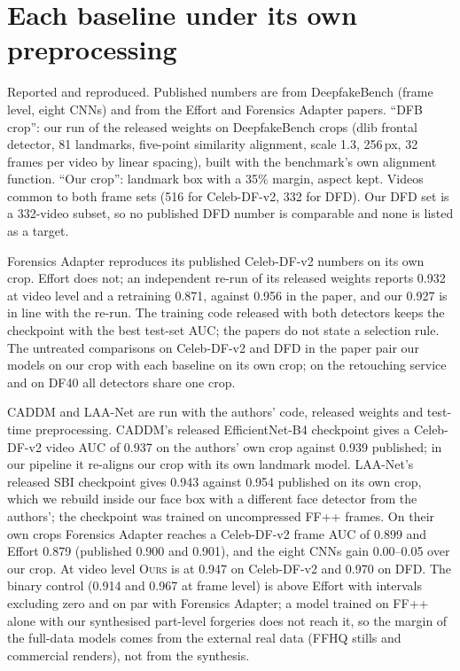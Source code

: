 \documentclass[10pt]{article}
\newcommand{\ours}{\textsc{Ours}}
\begin{document}
\section{Each baseline under its own preprocessing}
\begin{table}[H]
\centering
\caption{Reported and reproduced. Published numbers are from DeepfakeBench (frame level, eight CNNs) and from the Effort
and Forensics Adapter papers. ``DFB crop'': our run of the released weights on DeepfakeBench crops (dlib frontal
detector, 81 landmarks, five-point similarity alignment, scale 1.3, 256\,px, 32 frames per video by linear spacing), built
with the benchmark's own alignment function. ``Our crop'': landmark box with a 35\% margin, aspect kept. Videos common to
both frame sets (516 for Celeb-DF-v2, 332 for DFD). Our DFD set is a 332-video subset, so no published DFD number is
comparable and none is listed as a target.}
\label{tab:reproduce}
\footnotesize
\begin{adjustbox}{max width=\linewidth}\end{adjustbox}
\end{table}
Forensics Adapter reproduces its published Celeb-DF-v2 numbers on its own crop. Effort does not; an independent re-run
of its released weights reports 0.932 at video level and a retraining 0.871, against 0.956 in the paper, and our 0.927 is
in line with the re-run. The training code released with both detectors keeps the checkpoint with the best test-set AUC;
the papers do not state a selection rule. The untreated comparisons on Celeb-DF-v2 and DFD in the paper pair our models on our crop with each baseline
on its own crop; on the retouching service and on DF40 all detectors share one crop.

CADDM and LAA-Net are run with the authors' code, released weights and test-time preprocessing. CADDM's released
EfficientNet-B4 checkpoint gives a Celeb-DF-v2 video AUC of 0.937 on the authors' own crop against 0.939 published; in
our pipeline it re-aligns our crop with its own landmark model. LAA-Net's released SBI checkpoint gives 0.943 against
0.954 published on its own crop, which we rebuild inside our face box with a different face detector from the authors';
the checkpoint was trained on uncompressed FF++ frames. On their own crops Forensics Adapter reaches a Celeb-DF-v2 frame
AUC of 0.899 and Effort 0.879 (published 0.900 and 0.901), and the eight CNNs gain 0.00--0.05 over our crop. At video
level \ours{} is at 0.947 on Celeb-DF-v2 and 0.970 on DFD. The binary control (0.914 and 0.967 at frame level) is above
Effort with intervals excluding zero and on par with Forensics Adapter; a model trained on FF++ alone with our
synthesised part-level forgeries does not reach it, so the margin of the full-data models comes from the external real
data (FFHQ stills and commercial renders), not from the synthesis.
\end{document}
